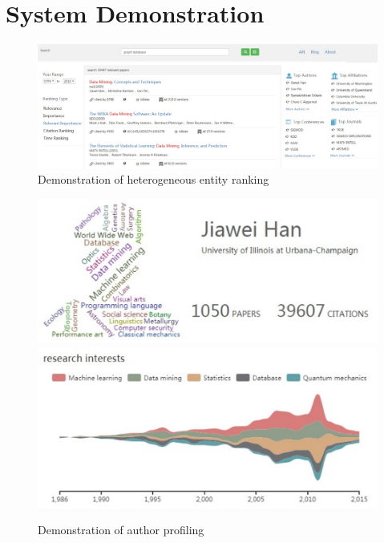 \section{System Demonstration}
\label{sec-demo}

\begin{figure}[tp]
\centering
\includegraphics[width=\textwidth]{searchKeywords.pdf}
\vspace{-3ex}
\caption{Demonstration of heterogeneous entity ranking}
\label{fig:searchKeywords}
\end{figure}

\begin{figure}
\centering
\includegraphics[width=\columnwidth]{hjwAvatar.pdf}
\includegraphics[width=\columnwidth]{hjwInterest.pdf}
\vspace{-2ex}
\caption{Demonstration of author profiling}
\label{fig:hjwProfile}
\end{figure}

